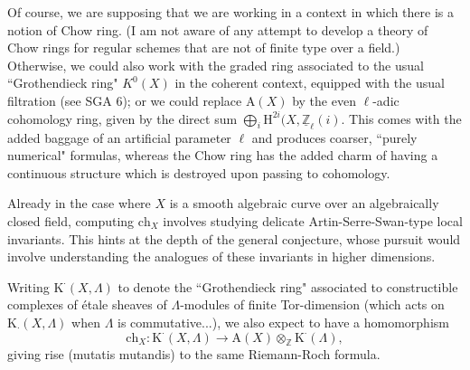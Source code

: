 Of course, we are supposing that we are working in a context in which there is a notion of Chow ring. (I am not aware of any attempt to develop a theory of Chow rings for regular schemes that are not of finite type over a field.) Otherwise, we could also work with the graded ring associated to the usual ``Grothendieck ring" $K^0(X)$ in the coherent context, equipped with the usual filtration (see SGA 6); or we could replace $\text{A}(X)$ by the even $\ell$-adic cohomology ring, given by the direct sum $\bigoplus_i \text{H}^{2i}(X, \underline{\mathbb{Z}}_\ell(i)$. This comes with the added baggage of an artificial parameter $\ell$ and produces coarser, ``purely numerical" formulas, whereas the Chow ring has the added charm of having a continuous structure which is destroyed upon passing to cohomology.

Already in the case where $X$ is a smooth algebraic curve over an algebraically closed field, computing $\text{ch}_X$ involves studying delicate Artin-Serre-Swan-type local invariants. This hints at the depth of the general conjecture, whose pursuit would involve understanding the analogues of these invariants in higher dimensions. 

\begin{rmk*}
Writing $\text{K}^{\cdot}(X, \Lambda)$ to denote the ``Grothendieck ring" associated to constructible complexes of \'etale sheaves of $\Lambda$-modules of finite Tor-dimension (which acts on $\text{K}_{\cdot}(X, \Lambda)$ when $\Lambda$ is commutative...), we also expect to have a homomorphism
\begin{equation}\label{chern1.2} 
\text{ch}_X: \text{K}^{\cdot}(X, \Lambda) \to \text{A}(X) \otimes_{\mathbb{Z}} \text{K}^\cdot(\Lambda), 
\end{equation}
giving rise (mutatis mutandis) to the same Riemann-Roch formula.
\end{rmk*}

